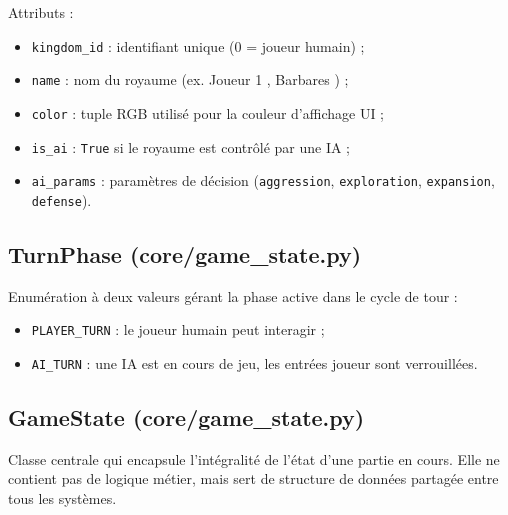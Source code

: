 \documentclass[12pt, a4paper]{article}
\begin{document}
Attributs :
\begin{itemize}
    \item \texttt{kingdom\_id} : identifiant unique (0 = joueur humain) ;
    \item \texttt{name} : nom du royaume (ex. \og Joueur 1 \fg{}, \og Barbares \fg{}) ;
    \item \texttt{color} : tuple RGB utilisé pour la couleur d'affichage UI ;
    \item \texttt{is\_ai} : \texttt{True} si le royaume est contrôlé par une IA ;
    \item \texttt{ai\_params} : paramètres de décision (\texttt{aggression}, \texttt{exploration},
    \texttt{expansion}, \texttt{defense}).
\end{itemize}

\subsection{TurnPhase (core/game\_state.py)}

Enumération à deux valeurs gérant la phase active dans le cycle de tour :
\begin{itemize}
    \item \texttt{PLAYER\_TURN} : le joueur humain peut interagir ;
    \item \texttt{AI\_TURN} : une IA est en cours de jeu, les entrées joueur sont verrouillées.
\end{itemize}

\subsection{GameState (core/game\_state.py)}

Classe centrale qui encapsule l'intégralité de l'état d'une partie en cours. Elle ne contient
pas de logique métier, mais sert de structure de données partagée entre tous les systèmes.
\end{document}

